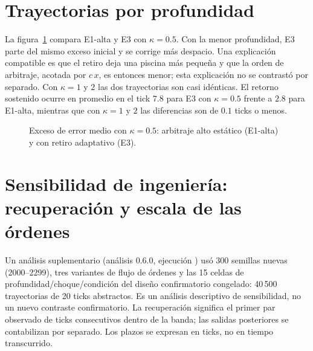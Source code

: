 \section{Trayectorias por profundidad}

La figura~\ref{fig:prof} compara E1-alta y E3 con $\kappa=0.5$. Con la menor profundidad, E3 parte del mismo exceso inicial y se corrige más despacio. Una explicación compatible es que el retiro deja una piscina más pequeña y que la orden de arbitraje, acotada por $c\,x$, es entonces menor; esta explicación no se contrastó por separado. Con $\kappa=1$ y $2$ las dos trayectorias son casi idénticas. El retorno sostenido ocurre en promedio en el tick $7.8$ para E3 con $\kappa=0.5$ frente a $2.8$ para E1-alta, mientras que con $\kappa=1$ y $2$ las diferencias son de $0.1$ ticks o menos.

\begin{figure}[htbp]
\centering
{}
\caption{Exceso de error medio con $\kappa=0.5$: arbitraje alto estático (E1-alta) y con retiro adaptativo (E3).}
\label{fig:prof}
\end{figure}

\section{Sensibilidad de ingeniería: recuperación y escala de las órdenes}
\label{sec:engineering-sensitivity}

Un análisis suplementario (análisis 0.6.0, ejecución \code{\EngineeringRunID}) usó 300 semillas nuevas (2000--2299), tres variantes de flujo de órdenes y las 15 celdas de profundidad/choque/condición del diseño confirmatorio congelado: 40\,500 trayectorias de 20 ticks abstractos. Es un análisis descriptivo de sensibilidad, no un nuevo contraste confirmatorio. La recuperación significa el primer par observado de ticks consecutivos dentro de la banda; las salidas posteriores se contabilizan por separado. Los plazos se expresan en ticks, no en tiempo transcurrido.


